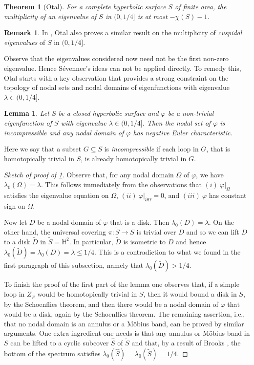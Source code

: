 \documentclass[a4paper,11pt]{amsart}
\numberwithin{equation}{section}
\newtheorem{lem}[equation]{Lemma}
\newtheorem{thm}[equation]{Theorem}
\theoremstyle{definition}
\newtheorem{rem}[equation]{Remark}
\def\vf{\varphi}
\begin{document}
\begin{thm}[Otal] \label{otal_mult}
For a complete hyperbolic surface $S$ of finite area, the multiplicity of an eigenvalue of $S$ in $(0,1/4]$ is at most $-\chi(S) -1$.
\end{thm}

\begin{rem}
In \cite{Ot}, Otal also proves a similar result on the multiplicity of \emph{cuspidal eigenvalues} of $S$ in $(0,1/4]$.
\end{rem}

Observe that the eigenvalues considered now need not be the first non-zero eigenvalue.
Hence S\'{e}vennec's ideas can not be applied directly. 
To remedy this, Otal starts with a key observation that provides a strong constraint on the topology of nodal sets and nodal domains of eigenfunctions with eigenvalue $\lambda\in(0,1/4]$.

\begin{lem}\label{incom_nodal}
Let $S$ be a closed hyperbolic surface and $\varphi$ be a non-trivial eigenfunction of $S$ with eigenvalue $\lambda\in(0,1/4]$.
Then the nodal set of $\vf$ is incompressible and any nodal domain of $\vf$ has negative Euler characteristic.
\end{lem}

Here we say that a subset  $G\subseteq S$ is \emph{incompressible} if each loop in $G$, that is homotopically trivial in $S$, is already homotopically trivial in $G$.

\begin{proof}[Sketch of proof of \cref{incom_nodal}]
Observe that, for any nodal domain $\Omega$ of $\vf$, we have $\lambda_0(\Omega) = \lambda$. 
This follows immediately from the observations that $(i)~ \vf|_\Omega$ satisfies the eigenvalue equation on $\Omega$, $(ii)~ \vf|_{\partial\Omega} = 0$, and $(iii)~ \vf$ has constant sign on $\Omega$.

Now let $D$ be a nodal domain of $\vf$ that is a disk. Then $\lambda_0(D) =\lambda$.
On the other hand, the universal covering $\pi\colon\tilde S\to S$ is trivial over $D$ and so
we can lift $D$ to a disk $\tilde D$ in $\tilde S=\mathbb{H}^2$.
In particular, $\tilde D$ is isometric to $D$ and hence $\lambda_0(\tilde D)= \lambda_0(D) =\lambda \le 1/4$.
This is a contradiction to what we found in the first paragraph of this subsection, namely that $\lambda_0(\tilde D)> 1/4$.

To finish the proof of the first part of the lemma one observes that, if a simple loop in $Z_\vf$ would be homotopically trivial in $S$, then it would bound a disk in $S$, by the Schoenflies theorem,
and then there would be a nodal domain of $\vf$ that would be a disk, again by  the Schoenflies theorem.
The remaining assertion, i.e., that no nodal domain is an annulus or a M\"obius band, can be proved by similar arguments.
One extra ingredient one needs is that any annulus or M\"obius band in $S$ can be lifted to a cyclic subcover $\hat S$ of $\tilde S$ and that, by a result of Brooks \cite{Br2}, the bottom of the spectrum satisfies $\lambda_0(\hat S)=\lambda_0(\tilde S)=1/4$.
\end{proof}
\end{document}
